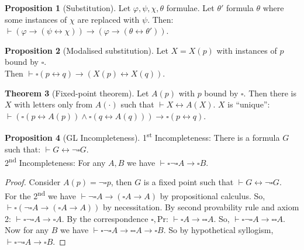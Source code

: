 \documentclass[a4paper,10pt]{article}
\theoremstyle{definition}
\newtheorem{theorem}{Theorem}
\newtheorem{proposition}[theorem]{Proposition}
\let\phi\varphi
\newcommand{\proves}{\vdash}
\begin{document}
\begin{proposition}[Substitution]
    Let $\phi, \psi, \chi, \theta$ formulae. Let $\theta'$ formula $\theta$ where some instances of $\chi$ are replaced with $\psi$. Then: $\proves (\phi \rightarrow (\psi \leftrightarrow \chi))\rightarrow (\phi \rightarrow (\theta \leftrightarrow \theta'))$. 
\end{proposition}

\begin{proposition}[Modalised substitution]
    Let $X = X(p)$ with instances of $p$ bound by $\square$. \\
    Then $\proves \square(p \leftrightarrow q) \rightarrow (X(p) \leftrightarrow X(q))$.
\end{proposition}

\begin{theorem}[Fixed-point theorem]
    Let $A(p)$ with $p$ bound by $\square$. Then there is $X$ with letters only from $A(\cdot)$ such that $\proves X \leftrightarrow A(X)$. $X$ is ``unique'': $\proves (\square(p \leftrightarrow A(p)) \land \square(q \leftrightarrow A(q))) \rightarrow \square (p \leftrightarrow q)$.
\end{theorem}

\begin{proposition}[GL Incompleteness]
    1\textsuperscript{st} Incompleteness: There is a formula $G$ such that: $\proves G \leftrightarrow \neg \square G$.\\
    2\textsuperscript{nd} Incompleteness: For any $A, B$ we have $\proves \square \neg \square A \rightarrow \square B$.
\end{proposition}

\begin{proof}
    Consider $A(p) = \neg \square p$, then $G$ is a fixed point such that $\proves G \leftrightarrow \neg \square G$.\\
    For the 2\textsuperscript{nd} we have $\proves \neg \square A \rightarrow (\square A \rightarrow A)$ by propositional calculus. So, $\proves \square (\neg \square A \rightarrow (\square A \rightarrow A))$ by necessitation. By second provability rule and axiom 2:  $\proves \square \neg \square A \rightarrow \square A$.
    By the correspondence $\square, \mathrm{Pr}$: $\proves \square A \rightarrow \square \square A$. So, $\proves \square \neg \square A \rightarrow \square \square A$. Now for any $B$ we have $\proves \square \neg \square A \rightarrow \square \square A \rightarrow \square B$. So by hypothetical syllogism, $\proves \square \neg \square A \rightarrow \square B$.
\end{proof}
\end{document}
